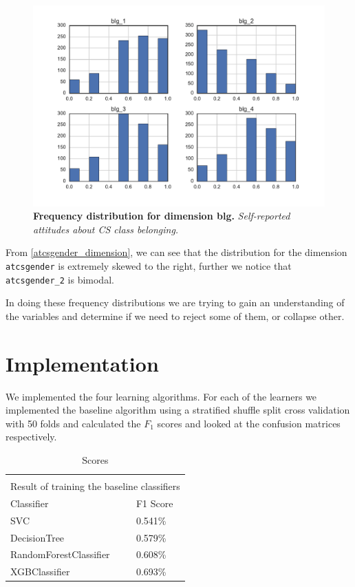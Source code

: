 \begin{figure}[!hbtp]
\centering
    \caption{\textbf{Frequency distribution for dimension blg. }\textit{Self-reported attitudes about CS class belonging.}}\label{blg_dimension}
    \includegraphics[width=1\textwidth]{figures/blg_dimension}
\end{figure}

From \ref{atcsgender_dimension}, we can see that the distribution for the dimension \texttt{atcsgender} is extremely skewed to the right, further we notice that \texttt{atcsgender\_2} is bimodal. 

In doing these frequency distributions we are trying to gain an understanding of the variables and determine if we need to reject some of them, or collapse other.




\section*{Implementation}
We implemented the four learning algorithms. For each of the learners we implemented the baseline algorithm using a stratified shuffle split cross validation with 50 folds and calculated the $F_1$ scores and looked at the confusion matrices respectively. 


\setlength{\extrarowheight}{1.5pt}
\begin{table}[!htbp]
\caption{Scores} %
\centering %
\begin{tabular}{|p{6cm}|p{1.5cm}|} %
\hline %


\multicolumn{2}{|c|}{}\\
\multicolumn{2}{|c|}{Result of training the baseline classifiers}\\[5pt]
\hline
Classifier & F1 Score\\[0.5ex]
\hline %

SVC     & 0.541\% \\
DecisionTree       & 0.579\% \\
RandomForestClassifier   & 0.608\% \\
XGBClassifier            & 0.693\% \\

\hline%
\end{tabular}
\label{tableBenchMarkScores}
\end{table}

